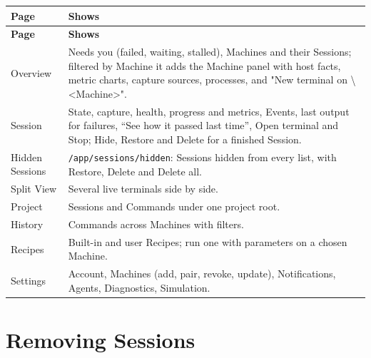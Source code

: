\begin{small}
\begin{longtable}{>{\raggedright\arraybackslash}p{0.166\dimexpr \linewidth-4\tabcolsep\relax}>{\raggedright\arraybackslash}p{0.834\dimexpr \linewidth-4\tabcolsep\relax}}
\toprule
\textbf{Page} & \textbf{Shows} \\
\midrule
\endfirsthead
\toprule
\textbf{Page} & \textbf{Shows} \\
\midrule
\endhead
Overview & Needs you (failed, waiting, stalled), Machines and their Sessions; filtered by Machine it adds the Machine panel with host facts, metric charts, capture sources, processes, and "New terminal on \textbackslash{}\textless{}Machine\textgreater{}". \\
Session & State, capture, health, progress and metrics, Events, last output for failures, ``See how it passed last time'', Open terminal and Stop; Hide, Restore and Delete for a finished Session. \\
Hidden Sessions & \texttt{/\allowbreak{}app/\allowbreak{}sessions/\allowbreak{}hidden}: Sessions hidden from every list, with Restore, Delete and Delete all. \\
Split View & Several live terminals side by side. \\
Project & Sessions and Commands under one project root. \\
History & Commands across Machines with filters. \\
Recipes & Built-in and user Recipes; run one with parameters on a chosen Machine. \\
Settings & Account, Machines (add, pair, revoke, update), Notifications, Agents, Diagnostics, Simulation. \\
\bottomrule
\end{longtable}
\end{small}

\section{Removing Sessions}

